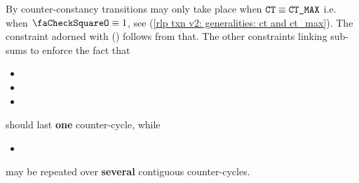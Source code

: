 \saNote{}
By counter-constancy transitions may only take place when $\texttt{CT} \equiv \texttt{CT\_MAX}$ i.e. when $\done \equiv 1$, see (\ref{rlp txn v2: generalities: ct and ct_max}).
The constraint adorned with (\sanityCheck) follows from that.
The other constraints linking sub-sums to \done{} enforce the fact that
\begin{itemize}
    \item \rlpTxnSharedColumnIsPrefixOfAccessListItem {}
    \item \rlpTxnSharedColumnIsAccessListAddress      {}
    \item \rlpTxnSharedColumnIsPrefixOfStorageKeyList {}
\end{itemize}
should last \textbf{one} counter-cycle, while
\begin{itemize}
    \item \rlpTxnSharedColumnIsAccessListStorageKey {}
\end{itemize}
may be repeated over \textbf{several} contiguous counter-cycles.
